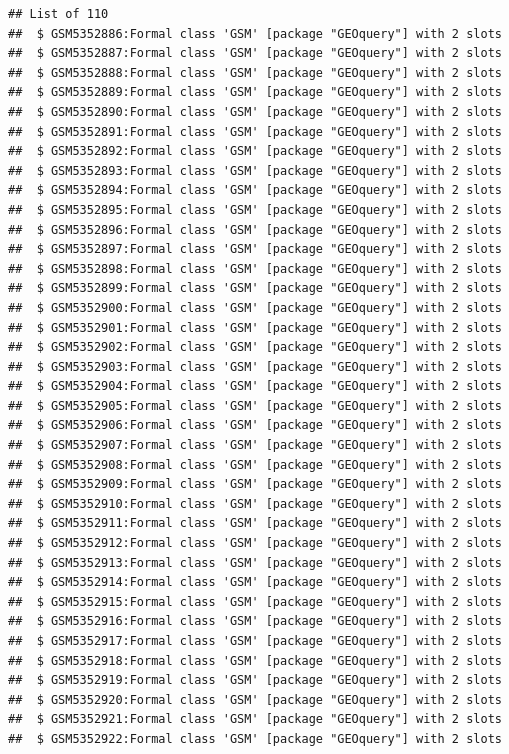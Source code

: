 \documentclass[
]{book}
\begin{document}
\begin{verbatim}
## List of 110
##  $ GSM5352886:Formal class 'GSM' [package "GEOquery"] with 2 slots
##  $ GSM5352887:Formal class 'GSM' [package "GEOquery"] with 2 slots
##  $ GSM5352888:Formal class 'GSM' [package "GEOquery"] with 2 slots
##  $ GSM5352889:Formal class 'GSM' [package "GEOquery"] with 2 slots
##  $ GSM5352890:Formal class 'GSM' [package "GEOquery"] with 2 slots
##  $ GSM5352891:Formal class 'GSM' [package "GEOquery"] with 2 slots
##  $ GSM5352892:Formal class 'GSM' [package "GEOquery"] with 2 slots
##  $ GSM5352893:Formal class 'GSM' [package "GEOquery"] with 2 slots
##  $ GSM5352894:Formal class 'GSM' [package "GEOquery"] with 2 slots
##  $ GSM5352895:Formal class 'GSM' [package "GEOquery"] with 2 slots
##  $ GSM5352896:Formal class 'GSM' [package "GEOquery"] with 2 slots
##  $ GSM5352897:Formal class 'GSM' [package "GEOquery"] with 2 slots
##  $ GSM5352898:Formal class 'GSM' [package "GEOquery"] with 2 slots
##  $ GSM5352899:Formal class 'GSM' [package "GEOquery"] with 2 slots
##  $ GSM5352900:Formal class 'GSM' [package "GEOquery"] with 2 slots
##  $ GSM5352901:Formal class 'GSM' [package "GEOquery"] with 2 slots
##  $ GSM5352902:Formal class 'GSM' [package "GEOquery"] with 2 slots
##  $ GSM5352903:Formal class 'GSM' [package "GEOquery"] with 2 slots
##  $ GSM5352904:Formal class 'GSM' [package "GEOquery"] with 2 slots
##  $ GSM5352905:Formal class 'GSM' [package "GEOquery"] with 2 slots
##  $ GSM5352906:Formal class 'GSM' [package "GEOquery"] with 2 slots
##  $ GSM5352907:Formal class 'GSM' [package "GEOquery"] with 2 slots
##  $ GSM5352908:Formal class 'GSM' [package "GEOquery"] with 2 slots
##  $ GSM5352909:Formal class 'GSM' [package "GEOquery"] with 2 slots
##  $ GSM5352910:Formal class 'GSM' [package "GEOquery"] with 2 slots
##  $ GSM5352911:Formal class 'GSM' [package "GEOquery"] with 2 slots
##  $ GSM5352912:Formal class 'GSM' [package "GEOquery"] with 2 slots
##  $ GSM5352913:Formal class 'GSM' [package "GEOquery"] with 2 slots
##  $ GSM5352914:Formal class 'GSM' [package "GEOquery"] with 2 slots
##  $ GSM5352915:Formal class 'GSM' [package "GEOquery"] with 2 slots
##  $ GSM5352916:Formal class 'GSM' [package "GEOquery"] with 2 slots
##  $ GSM5352917:Formal class 'GSM' [package "GEOquery"] with 2 slots
##  $ GSM5352918:Formal class 'GSM' [package "GEOquery"] with 2 slots
##  $ GSM5352919:Formal class 'GSM' [package "GEOquery"] with 2 slots
##  $ GSM5352920:Formal class 'GSM' [package "GEOquery"] with 2 slots
##  $ GSM5352921:Formal class 'GSM' [package "GEOquery"] with 2 slots
##  $ GSM5352922:Formal class 'GSM' [package "GEOquery"] with 2 slots

\end{verbatim}
\end{document}
